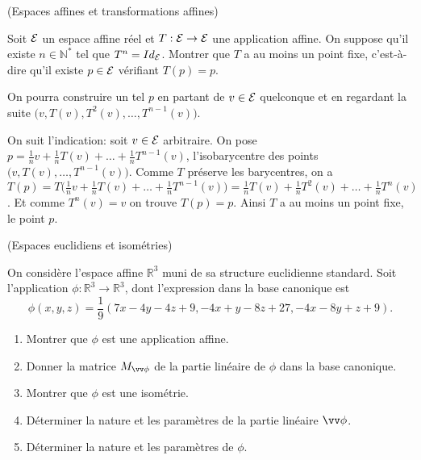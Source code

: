 \documentclass[a4paper,12pt,reqno]{amsart}
\begin{document}
\sisujet{\bigskip}
\begin{exo} (Espaces affines et transformations affines)

Soit $\mathcal{E}$ un espace affine réel et $T: \mathcal{E} \to \mathcal{E}$ une application affine. On suppose qu'il existe $n \in \mathbb{N}^*$ tel que $T^n = Id_\mathcal{E}$. Montrer que $T$ a au moins un point fixe, c'est-à-dire qu'il existe $p \in \mathcal{E}$ vérifiant $T(p) = p$.

\begin{indication}
  On pourra construire un tel $p$ en partant de $v \in \mathcal{E}$ quelconque et en regardant la suite $\big(v, T(v), T^2(v), \dots, T^{n-1}(v)\big)$.
\end{indication}

\end{exo}

\begin{solution}
  On suit l'indication: soit $v \in \mathcal{E}$ arbitraire. On pose $p = \frac1n v + \frac1n T(v) + \dots + \frac1n T^{n-1}(v)$, l'isobarycentre des points $\big(v, T(v), \dots, T^{n-1}(v)\big)$. Comme $T$ préserve les barycentres, on a $T(p) = T\big(\frac1n v + \frac1n T(v) + \dots + \frac1n T^{n-1}(v)\big) = \frac1n T(v) + \frac1n T^{2}(v) + \dots + \frac1n T^{n}(v)$. Et comme $T^{n}(v) = v$ on trouve $T(p)=p$. Ainsi $T$ a au moins un point fixe, le point $p$.
\end{solution}


\sisujet{\newpage}
\begin{exo} (Espaces euclidiens et isométries)

    On considère l'espace affine $\mathbb{R}^{3}$ muni de sa structure euclidienne standard. Soit l'application $\phi : \mathbb{R}^{3} \rightarrow \mathbb{R}^{3}$, dont l'expression dans la base canonique est
    \[
      \phi(x,y,z) = \frac{1}{9}(7x-4y-4z+9,-4x+y-8z+27,-4x-8y+z+9).
    \]

  \begin{enumerate}
    \item Montrer que $\phi$ est une application affine.
    \item Donner la matrice $M_{\vv\phi}$ de la partie linéaire de $\phi$ dans la base canonique.
    \item Montrer que $\phi$ est une isométrie.
    \item Déterminer la nature et les paramètres de la partie linéaire $\vv\phi$.
    \item Déterminer la nature et les paramètres de $\phi$.
  \end{enumerate}
\end{exo}
\end{document}
